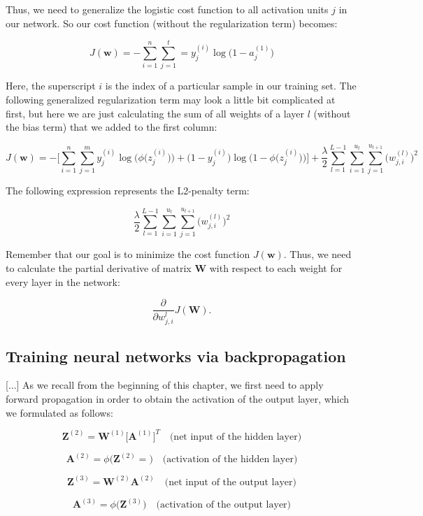 \documentclass[letterpaper]{report}
\begin{document}
Thus, we need to generalize the logistic cost function to all activation units $j$ in our network. So our cost function (without the regularization term) becomes:

\[
J(\mathbf{w}) = - \sum_{i=1}^{n} \sum_{j=1}^{t} = y_{j}^{(i)} \log \big( 1 - a^{(1)}_{j}  \big)
\]

Here, the superscript $i$ is the index of a particular sample in our training set.
The following generalized regularization term may look a little bit complicated at first, but here we are just calculating the sum of all weights of a layer $l$ (without the bias term) that we added to the first column:

\[
J(\mathbf{w}) = - \Bigg[ \sum_{i=1}^{n} \sum_{j=1}^{m} y_{j}^{(i)}  \log \bigg( \phi \Big( z_{j}^{(i)} \Big) \bigg) + \Big(1 - y_{j}^{(i)} \Big) \log  \bigg(1 - \phi \Big( z_{j}^{(i)} \Big)  \bigg) \Bigg] + \frac{\lambda}{2} \sum_{l=1}^{L-1} \sum_{i=1}^{u_l} \sum_{j=1}^{u_{l+1}} \Big(w_{j, i}^{(l)}\Big)^2
\]

The following expression represents the L2-penalty term:

\[
\frac{\lambda}{2} \sum_{l=1}^{L-1} \sum_{i=1}^{u_l} \sum_{j=1}^{u_{l+1}} \Big(w_{j, i}^{(l)}\Big)^2
\]

Remember that our goal is to minimize the cost function $J(\mathbf{w})$. Thus, we need to calculate the partial derivative of matrix $\mathbf{W}$ with respect to each weight for every layer in the network:

\[
\frac{\partial}{\partial w_{j, i}^{l}} J(\mathbf{W}).
\]


\subsection{Training neural networks via backpropagation}

[...] As we recall from the beginning of this chapter, we first need to apply forward propagation in order to obtain the activation of the output layer, which we formulated as follows:

\[
\mathbf{Z}^{(2)} = \mathbf{W}^{(1)} \Big[ \mathbf{A}^{(1)}  \Big]^T  \quad \text{(net input of the hidden layer)}
\]

\[
\mathbf{A}^{(2)} = \phi \big( \mathbf{Z}^{(2)} =  \big) \quad \text{(activation of the hidden layer)}
\]

\[
\mathbf{Z}^{(3)} = \mathbf{W}^{(2)}  \mathbf{A}^{(2)}  \quad \text{(net input of the output layer)}
\]

\[
\mathbf{A}^{(3)} = \phi \big( \mathbf{Z}^{(3)}  \big) \quad \text{(activation of the output layer)}
\]
\end{document}
